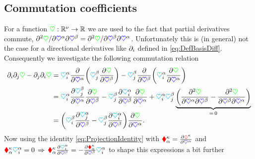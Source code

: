 \subsection{Commutation coefficients}\label{sec:CommutationCoeff}
For a function $\potentialEnergy : \RealNum^{\numCoord} \rightarrow \RealNum$ we are used to the fact that partial derivatives commute, \ie $\sfrac{\partial^2 \potentialEnergy}{\partial \sysCoordCoeff{\GidxI} \partial \sysCoordCoeff{\GidxII}} = \sfrac{\partial^2 \potentialEnergy}{\partial \sysCoordCoeff{\GidxII} \partial \sysCoordCoeff{\GidxI}}$.
Unfortunately this is (in general) not the case for a directional derivatives like $\dirDiff{\LidxI}$ defined in \eqref{eq:DefBasisDiff}.
Consequently we investigate the following commutation relation
\begin{align}\label{eq:DerivationCommCoeff1}
 \dirDiff{\LidxI} \dirDiff{\LidxII} \potentialEnergy - \dirDiff{\LidxII} \dirDiff{\LidxI} \potentialEnergy 
 &= \kinMatCoeff{\GidxI}{\LidxI} \pdiff{\sysCoordCoeff{\GidxI}} \bigg( \kinMatCoeff{\GidxII}{\LidxII} \pdiff[\potentialEnergy]{\sysCoordCoeff{\GidxII}}\bigg) - \kinMatCoeff{\GidxII}{\LidxII} \pdiff{\sysCoordCoeff{\GidxII}} \bigg(\kinMatCoeff{\GidxI}{\LidxI} \pdiff[\potentialEnergy ]{\sysCoordCoeff{\GidxI}} \bigg)
\nonumber\\
 &= \kinMatCoeff{\GidxI}{\LidxI} \pdiff[\kinMatCoeff{\GidxII}{\LidxII}]{\sysCoordCoeff{\GidxI}} \pdiff[\potentialEnergy]{\sysCoordCoeff{\GidxII}} - \kinMatCoeff{\GidxII}{\LidxII} \pdiff[\kinMatCoeff{\GidxI}{\LidxI}]{\sysCoordCoeff{\GidxII}} \pdiff[\potentialEnergy ]{\sysCoordCoeff{\GidxI}}
 + \kinMatCoeff{\GidxI}{\LidxI} \kinMatCoeff{\GidxII}{\LidxII} \underbrace{\bigg( \frac{\partial^2 \potentialEnergy}{\partial\sysCoordCoeff{\GidxI} \partial\sysCoordCoeff{\GidxII}} - \frac{\partial^2 \potentialEnergy}{\partial\sysCoordCoeff{\GidxII} \partial\sysCoordCoeff{\GidxI}}\bigg)}_{=\,0}
\nonumber\\[-2ex]
 &= \bigg(\kinMatCoeff{\GidxII}{\LidxI} \pdiff[\kinMatCoeff{\GidxI}{\LidxII}]{\sysCoordCoeff{\GidxII}} - \kinMatCoeff{\GidxII}{\LidxII} \pdiff[\kinMatCoeff{\GidxI}{\LidxI}]{\sysCoordCoeff{\GidxII}}\bigg) \pdiff[\potentialEnergy]{\sysCoordCoeff{\GidxI}}
 .
\end{align}
Now using the identity \eqref{eq:ProjectionIdentity} with $\geoConstraintMatCoeff{\CidxI}{\GidxI} = \pdiff[\geoConstraintCoeff{\CidxI}]{\sysCoordCoeff{\GidxI}}$ and $\geoConstraintMatCoeff{\CidxI}{\GidxI} \kinMatCoeff{\GidxI}{\LidxI} = 0 \, \Rightarrow \, \geoConstraintMatCoeff{\CidxI}{\GidxI} \pdiff[\kinMatCoeff{\GidxI}{\LidxI}]{\sysCoordCoeff{\GidxII}} = -\pdiff[\geoConstraintMatCoeff{\CidxI}{\GidxI}]{\sysCoordCoeff{\GidxII}} \kinMatCoeff{\GidxI}{\LidxI}$ to shape this expressions a bit further
